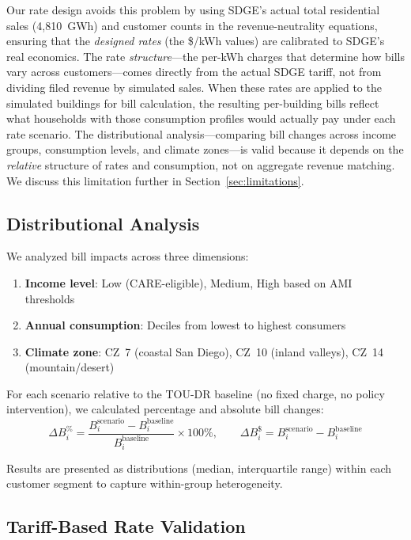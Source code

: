 \documentclass[12pt]{article}
\begin{document}
Our rate design avoids this problem by using SDGE's actual total residential sales (4,810~GWh) and customer counts in the revenue-neutrality equations, ensuring that the \textit{designed rates} (the \$/kWh values) are calibrated to SDGE's real economics. The rate \textit{structure}---the per-kWh charges that determine how bills vary across customers---comes directly from the actual SDGE tariff, not from dividing filed revenue by simulated sales. When these rates are applied to the simulated buildings for bill calculation, the resulting per-building bills reflect what households with those consumption profiles would actually pay under each rate scenario. The distributional analysis---comparing bill changes across income groups, consumption levels, and climate zones---is valid because it depends on the \textit{relative} structure of rates and consumption, not on aggregate revenue matching. We discuss this limitation further in Section~\ref{sec:limitations}.

\subsection{Distributional Analysis}

We analyzed bill impacts across three dimensions:
\begin{enumerate}
    \item \textbf{Income level}: Low (CARE-eligible), Medium, High based on AMI thresholds
    \item \textbf{Annual consumption}: Deciles from lowest to highest consumers
    \item \textbf{Climate zone}: CZ~7 (coastal San Diego), CZ~10 (inland valleys), CZ~14 (mountain/desert)
\end{enumerate}

For each scenario relative to the TOU-DR baseline (no fixed charge, no policy intervention), we calculated percentage and absolute bill changes:
\begin{equation}
\Delta B_i^{\%} = \frac{B_i^{\text{scenario}} - B_i^{\text{baseline}}}{B_i^{\text{baseline}}} \times 100\%, \qquad
\Delta B_i^{\$} = B_i^{\text{scenario}} - B_i^{\text{baseline}}
\end{equation}

Results are presented as distributions (median, interquartile range) within each customer segment to capture within-group heterogeneity.

\subsection{Tariff-Based Rate Validation}
\label{sec:tariff_validation}
\end{document}
